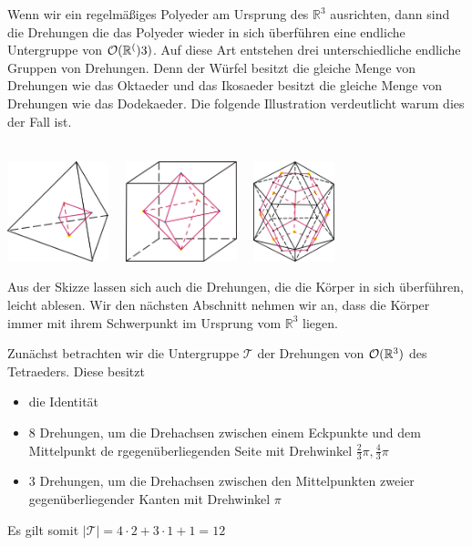  Wenn wir ein regelmäßiges Polyeder am Ursprung des $\mathbb{R}^3$ ausrichten, dann sind die Drehungen die das Polyeder wieder in sich überführen eine endliche Untergruppe von ${\mathcal{O}(\mathbb{R}^()}3)$. Auf diese Art entstehen drei unterschiedliche endliche Gruppen von Drehungen. Denn der Würfel besitzt die gleiche Menge von Drehungen wie das Oktaeder und das Ikosaeder besitzt die gleiche Menge von Drehungen wie das Dodekaeder. Die folgende Illustration verdeutlicht warum dies der Fall ist.
 \\  \\
 \begin{center}
 \includegraphics[height=110px]{./Grafiken/Duality_Tetra-Tetra.png} \ \
 \includegraphics[height=110px]{./Grafiken/Duality_Hexa-Okta.png} \ \
 \includegraphics[height=110px]{./Grafiken/Duality_Iko-Dodek.png}
 \end{center}
 \newpage
Aus der Skizze lassen sich auch die Drehungen, die die Körper in sich überführen, leicht ablesen. Wir den nächsten Abschnitt nehmen wir an, dass die Körper immer mit ihrem Schwerpunkt im Ursprung vom $\mathbb{R}^3$ liegen.

Zunächst betrachten wir die Untergruppe $\mathcal{T}$ der Drehungen von ${\mathcal{O}(\mathbb{R}^3)}$ des Tetraeders. Diese besitzt
\begin{itemize}
  \item die Identität
  \item 8 Drehungen, um die Drehachsen zwischen einem Eckpunkte und dem Mittelpunkt de rgegenüberliegenden Seite mit Drehwinkel $\frac{2}{3}\pi,\frac{4}{3}\pi$
  \item 3 Drehungen, um die Drehachsen zwischen den Mittelpunkten zweier gegenüberliegender Kanten mit Drehwinkel $\pi$
\end{itemize}
Es gilt somit $|\mathcal{T}|=4 \cdot 2 + 3 \cdot 1 +1 = 12$

